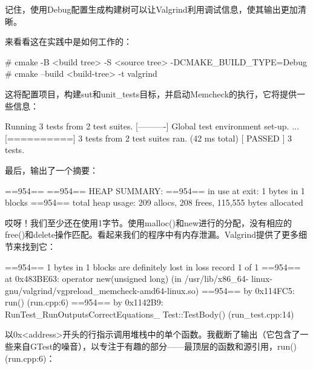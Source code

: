 记住，使用Debug配置生成构建树可以让Valgrind利用调试信息，使其输出更加清晰。

来看看这在实践中是如何工作的：

\begin{shell}
# cmake -B <build tree> -S <source tree> -DCMAKE_BUILD_TYPE=Debug
# cmake --build <build-tree> -t valgrind
\end{shell}

这将配置项目，构建sut和unit\_tests目标，并启动Memcheck的执行，它将提供一些信息：

 Running 3 tests from 2 test suites.
[----------] Global test environment set-up.
...
[==========] 3 tests from 2 test suites ran. (42 ms total)
[ PASSED ] 3 tests.
\end{shell}

最后，输出了一个摘要：

\begin{shell}
==954==
==954== HEAP SUMMARY:
==954==     in use at exit: 1 bytes in 1 blocks
==954==   total heap usage: 209 allocs, 208 frees, 115,555 bytes allocated
\end{shell}

哎呀！我们至少还在使用1字节。使用malloc()和new进行的分配，没有相应的free()和delete操作匹配。看起来我们的程序中有内存泄漏。Valgrind提供了更多细节来找到它：

\begin{shell}
==954== 1 bytes in 1 blocks are definitely lost in loss record 1 of 1
==954==   at 0x483BE63: operator new(unsigned long) (in /usr/lib/x86_64-
linux-gnu/valgrind/vgpreload_memcheck-amd64-linux.so)
==954==   by 0x114FC5: run() (run.cpp:6)
==954==   by 0x1142B9: RunTest_RunOutputsCorrectEquations_
Test::TestBody() (run_test.cpp:14)
\end{shell}

以0x<address>开头的行指示调用堆栈中的单个函数。我截断了输出（它包含了一些来自GTest的噪音），以专注于有趣的部分——最顶层的函数和源引用，run()(run.cpp:6)：

